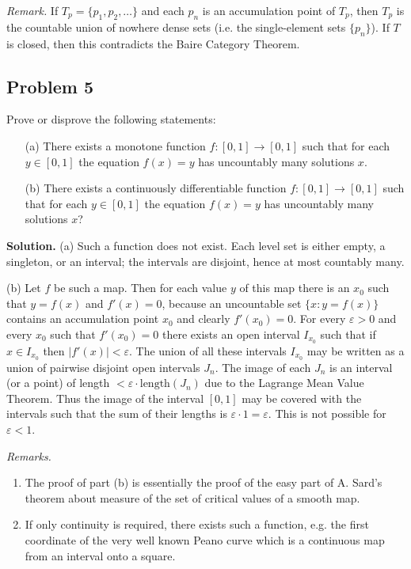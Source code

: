 \documentclass{article}
\begin{document}
\textit{Remark.} If \(T_p = \{p_1, p_2, \ldots\}\) and each \(p_n\) is
an accumulation point of \(T_p\), then \(T_p\) is the countable union of
nowhere dense sets (i.e. the single-element sets \(\{p_n\}\)).
If \(T\) is closed, then this contradicts the Baire Category Theorem.

\subsection*{Problem 5}
Prove or disprove the following statements:
\begin{enumerate}
\item[(a)] There exists a monotone function $f: [0,1] \to [0,1]$ such that for each $y \in [0,1]$
 the equation $f(x) = y$ has uncountably many solutions $x$.
\item[(b)] There exists a continuously differentiable function $f: [0,1] \to [0,1]$ such that
for each $y \in [0,1]$ the equation $f(x) = y$ has uncountably many solutions $x$?
\end{enumerate}

\textbf{Solution.}
(a) Such a function does not exist.
Each level set is either empty, a singleton, or an interval;
the intervals are disjoint, hence at most countably many.

(b) Let \( f \) be such a map. Then for each value \( y \) of this map there is
an \( x_0 \) such that \( y = f(x) \) and \( f'(x) = 0 \),
because an uncountable set \( \{x : y = f(x)\} \) contains an accumulation point \( x_0 \)
and clearly \( f'(x_0) = 0 \).
For every \( \varepsilon > 0 \) and every \( x_0 \) such that \( f'(x_0) = 0 \)
there exists an open interval \( I_{x_0} \) such that if \( x \in I_{x_0} \)
then \( |f'(x)| < \varepsilon \). The union of all these intervals \( I_{x_0} \) may be written
as a union of pairwise disjoint open intervals \( J_n \).
The image of each \( J_n \) is an interval (or a point) of length \( < \varepsilon \cdot \text{length}(J_n) \)
due to the Lagrange Mean Value Theorem. Thus the image of the interval \([0,1]\) may be covered
with the intervals such that the sum of their lengths is \( \varepsilon \cdot 1 = \varepsilon \).
This is not possible for \( \varepsilon < 1 \).

\textit{Remarks.}
\begin{enumerate}
    \item The proof of part (b) is essentially the proof of the easy part of A. Sard’s theorem about measure of the set of critical values of a smooth map.
    \item If only continuity is required, there exists such a function, e.g. the first coordinate of the very well known Peano curve which is a continuous map from an interval onto a square.
\end{enumerate}
\end{document}

